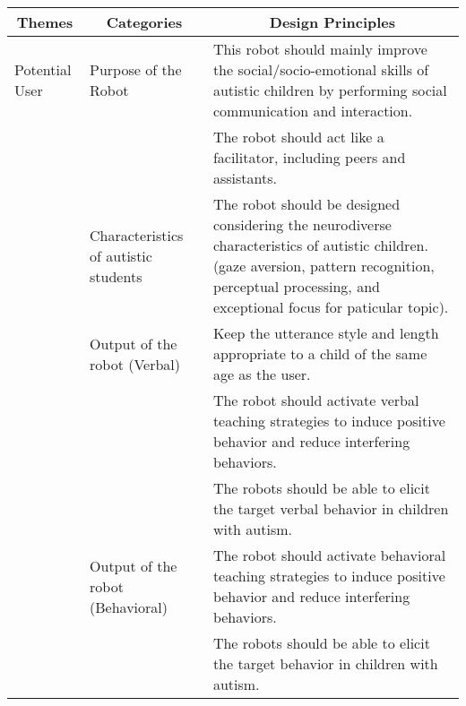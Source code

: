 \begin{table*}[hbt!]
\scriptsize
\begin{tabular}{p{2cm} p{3cm} p{7cm}}
\hline
\multicolumn{1}{c}{\textbf{Themes}} & \multicolumn{1}{c}{\textbf{Categories}}   & \multicolumn{1}{c}{\textbf{Design Principles}}                                                                                                   \\
\hline
Potential User                      & Purpose of the Robot                      & This robot should mainly improve the social/socio-emotional skills of autistic children by performing social communication and interaction. \\
                                    &                                           & The robot should act like a facilitator, including peers and assistants.                                                                         \\
                                    & Characteristics of autistic students      & The robot should be designed considering the neurodiverse characteristics of autistic children. (gaze aversion, pattern recognition, perceptual processing, and exceptional focus for paticular topic).
                                    \\
                                    & Output of the robot (Verbal)              & Keep the utterance style and length appropriate to a child of the same age as the user.                                                          \\
                                    &                                           & The robot should activate verbal teaching strategies to induce positive behavior and reduce interfering behaviors.                               \\
                                    &                                           & The robots should be able to elicit the target verbal behavior in children with autism.                                                             \\
                                    & Output of the robot (Behavioral)          & The robot should activate behavioral teaching strategies to induce positive behavior and reduce interfering behaviors.                           \\
                                    &                                           & The robots should be able to elicit the target behavior in children with autism.                                                                    \\

\end{tabular}
\end{table*}
